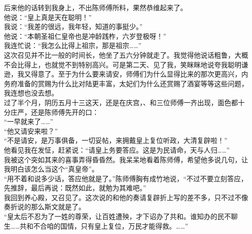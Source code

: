 后来他的话转到我身上，不出陈师傅所料，果然恭维起来了。\\

他说：“皇上真是天在聪明！”\\

我说：“我差的很远，我年轻，知道的事挺少。”\\

他说：“本朝圣祖仁皇帝也是冲龄践柞，六岁登极呀！”\\

我连忙说：“我怎么比得上祖宗，那是祖宗……”\\

这次召见并不比一般的时间长，他坐了五六分钟就走了。我觉得他说话粗鲁，大概不会比得上，也就觉不到特别高兴。可是第二天、见了我，笑眯眯地说夸我聪明谦逊，我又得意了。至于为什么要来请安，师傅们为什么显得比来的那次更高兴，内务府准备的赏赐为什么比对陆更丰富，太妃们为什么还赏赐了酒宴等等这些问题，我连想也没去想。\\

过了半个月，阴历五月十三这天，还是在庆宫，、和三位师傅一齐出现，面色都十分庄严，还是陈师傅先开的口：\\

“一早就来了……”\\

“他又请安来啦？”\\

“不是请安，是万事俱备，一切妥帖，来拥戴皇上复位听政，大清复辟啦！”\\

他看见我在发怔，赶紧说：“请皇上务要答应。这是为民请命，天与人归……”\\

我被这个突如其来的喜事弄得昏昏然。我呆呆地看着陈师傅，希望他多说几句，让我明白该怎么当这个“真皇帝”。\\

“用不着和说多少话，答应他就是了。”陈师傅胸有成竹地说，“不过不要立刻答应，先推辞，最后再说：既然如此，就勉为其难吧。”\\

我回到养心殿，又召见了。这次说的和他的奏请复辟折上写的差不多，只不过不像奏折说的那么斯文就是了。\\

“皇太后不忍为了一姓的尊荣，让百姓遭殃，才下诏办了共和。谁知办的民不聊生……共和不合咱的国情，只有皇上复位，万民才能得救。……”\\

